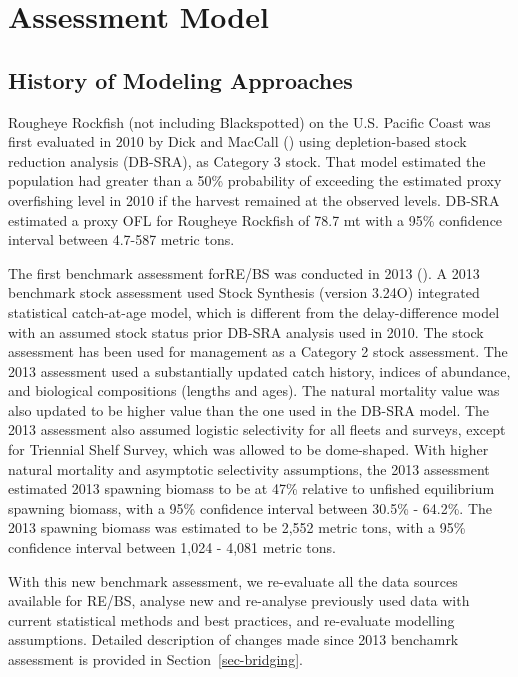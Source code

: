 \documentclass[
]{scrartcl}
\begin{document}
\newpage{}

\section{Assessment Model}\label{assessment-model}

\subsection{History of Modeling
Approaches}\label{history-of-modeling-approaches}

Rougheye Rockfish (not including Blackspotted) on the U.S. Pacific Coast
was first evaluated in 2010 by Dick and MacCall
() using depletion-based stock
reduction analysis (DB-SRA), as Category 3 stock. That model estimated
the population had greater than a 50\% probability of exceeding the
estimated proxy overfishing level in 2010 if the harvest remained at the
observed levels. DB-SRA estimated a proxy OFL for Rougheye Rockfish of
78.7 mt with a 95\% confidence interval between 4.7-587 metric tons.

The first benchmark assessment forRE/BS was conducted in 2013
(). A
2013 benchmark stock assessment used Stock Synthesis (version 3.24O)
integrated statistical catch-at-age model, which is different from the
delay-difference model with an assumed stock status prior DB-SRA
analysis used in 2010. The stock assessment has been used for management
as a Category 2 stock assessment. The 2013 assessment used a
substantially updated catch history, indices of abundance, and
biological compositions (lengths and ages). The natural mortality value
was also updated to be higher value than the one used in the DB-SRA
model. The 2013 assessment also assumed logistic selectivity for all
fleets and surveys, except for Triennial Shelf Survey, which was allowed
to be dome-shaped. With higher natural mortality and asymptotic
selectivity assumptions, the 2013 assessment estimated 2013 spawning
biomass to be at 47\% relative to unfished equilibrium spawning biomass,
with a 95\% confidence interval between 30.5\% - 64.2\%. The 2013
spawning biomass was estimated to be 2,552 metric tons, with a 95\%
confidence interval between 1,024 - 4,081 metric tons.

With this new benchmark assessment, we re-evaluate all the data sources
available for RE/BS, analyse new and re-analyse previously used data
with current statistical methods and best practices, and re-evaluate
modelling assumptions. Detailed description of changes made since 2013
benchamrk assessment is provided in Section~\ref{sec-bridging}.
\end{document}
